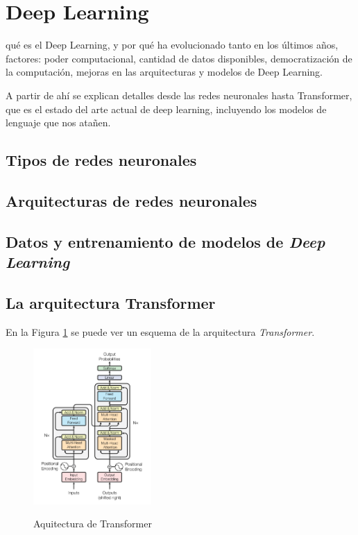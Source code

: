 \section{Deep Learning}

qué es el Deep Learning, y por qué ha evolucionado tanto en los últimos años, factores: poder computacional, cantidad de datos disponibles, democratización de la computación, mejoras en las arquitecturas y modelos de Deep Learning.

A partir de ahí se explican detalles desde las redes neuronales hasta Transformer, que es el estado del arte actual de deep learning, incluyendo los modelos de lenguaje que nos atañen.


\subsection{Tipos de redes neuronales}
\subsection{Arquitecturas de redes neuronales}
\subsection{Datos y entrenamiento de modelos de \textit{Deep Learning}}

\subsection{La arquitectura Transformer}

En la Figura \ref{fig:transformer_architecture} se puede ver un esquema de la arquitectura \textit{Transformer}.

\begin{figure}[]
    \caption[Aquitectura de Transformer]{Aquitectura de Transformer}
    \centering
    \includegraphics[width=0.4\textwidth]{./figuras/Transformer_architecture.png}
    \label{fig:transformer_architecture}
\end{figure}


